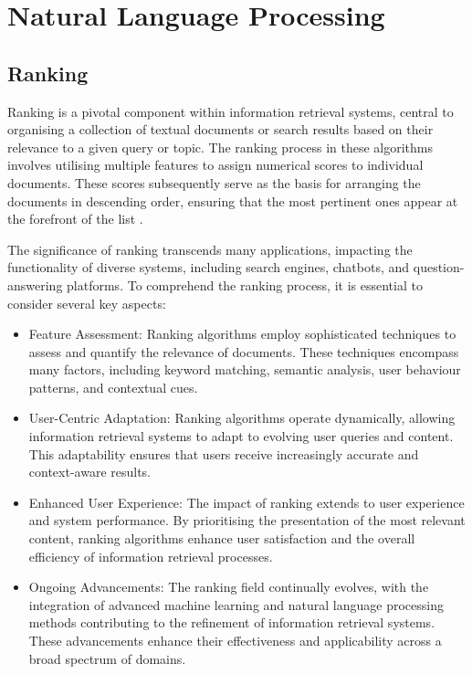\section{Natural Language Processing}
\subsection{Ranking}
Ranking is a pivotal component within information retrieval systems, central to organising a collection of textual documents or search results based on their relevance to a given query or topic. The ranking process in these algorithms involves utilising multiple features to assign numerical scores to individual documents. These scores subsequently serve as the basis for arranging the documents in descending order, ensuring that the most pertinent ones appear at the forefront of the list \cite{wu}.

The significance of ranking transcends many applications, impacting the functionality of diverse systems, including search engines, chatbots, and question-answering platforms. To comprehend the ranking process, it is essential to consider several key aspects:

\begin{itemize}
    \item Feature Assessment: Ranking algorithms employ sophisticated techniques to assess and quantify the relevance of documents. These techniques encompass many factors, including keyword matching, semantic analysis, user behaviour patterns, and contextual cues.
    \item User-Centric Adaptation: Ranking algorithms operate dynamically, allowing information retrieval systems to adapt to evolving user queries and content. This adaptability ensures that users receive increasingly accurate and context-aware results.
    \item Enhanced User Experience: The impact of ranking extends to user experience and system performance. By prioritising the presentation of the most relevant content, ranking algorithms enhance user satisfaction and the overall efficiency of information retrieval processes.
    \item Ongoing Advancements: The ranking field continually evolves, with the integration of advanced machine learning and natural language processing methods contributing to the refinement of information retrieval systems. These advancements enhance their effectiveness and applicability across a broad spectrum of domains.
\end{itemize}

